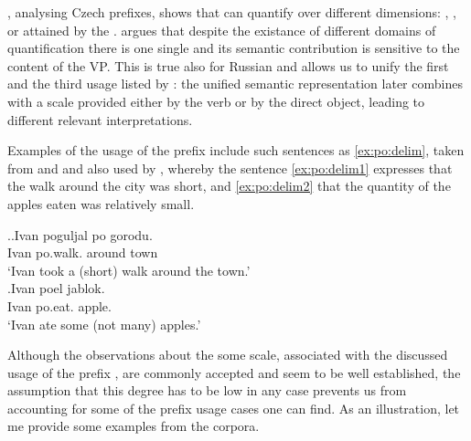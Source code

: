 \citet{Souchkova:04}, analysing Czech prefixes, shows that  can quantify over different dimensions: , , or  attained by the . \citeauthor{Souchkova:04} argues that despite the existance of different domains of quantification there is one single   and its semantic contribution is sensitive to the content of the VP. This is true also for Russian and allows us to unify the first and the third usage listed by \citet{Shvedova:82}: the unified semantic representation later combines with a scale provided either by the verb or by the direct object, leading to different relevant interpretations.\largerpage[-1]

Examples of the  usage of the prefix  include such sentences as \ref{ex:po:delim}, taken from \citet{Filip:00} and \citet{Souchkova:04} and also used by \citet{Kagan:book}, whereby the sentence \ref{ex:po:delim1} expresses that the walk around the city was short, and \ref{ex:po:delim2} that the quantity of the apples eaten was relatively small.

\ex.\label{ex:po:delim}\ag.\label{ex:po:delim1}Ivan poguljal po gorodu.\\
Ivan po.walk. around town\\
\trans `Ivan took a (short) walk around the town.'\\
\bg.\label{ex:po:delim2}Ivan poel jablok.\\
Ivan po.eat. apple.\\
\trans `Ivan ate some (not many) apples.'


Although the observations about the  some scale, associated with the discussed usage of the prefix , are commonly accepted and seem to be well established, the assumption that this degree has to be low in any case prevents us from accounting for some of the prefix usage cases one can find. As an illustration, let me provide some examples from the corpora.


